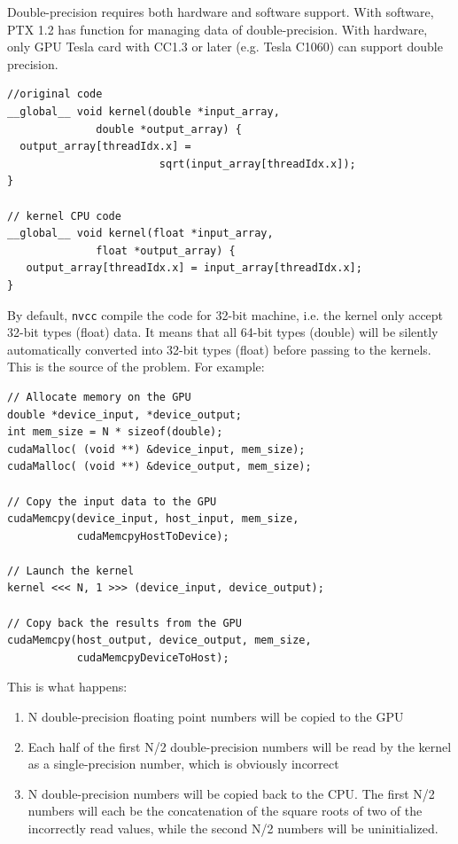 Double-precision requires both hardware and software support. With
software, PTX 1.2 has function for managing data of
double-precision. With hardware, only GPU Tesla card with CC1.3 or
later (e.g. Tesla C1060) can support double precision. 
\begin{lstlisting}
//original code
__global__ void kernel(double *input_array, 
              double *output_array) {
  output_array[threadIdx.x] = 
                        sqrt(input_array[threadIdx.x]);
}

// kernel CPU code
__global__ void kernel(float *input_array, 
              float *output_array) {
   output_array[threadIdx.x] = input_array[threadIdx.x];
}
\end{lstlisting}
By default, \verb!nvcc! compile the code for 32-bit machine, i.e. the
kernel only accept 32-bit types (float) data. It means that all 64-bit
types (double) will be silently automatically converted into 32-bit
types (float) before passing to the kernels. This is the source of the
problem. For example:
\begin{lstlisting}
// Allocate memory on the GPU
double *device_input, *device_output;
int mem_size = N * sizeof(double);
cudaMalloc( (void **) &device_input, mem_size);
cudaMalloc( (void **) &device_output, mem_size);

// Copy the input data to the GPU
cudaMemcpy(device_input, host_input, mem_size, 
           cudaMemcpyHostToDevice);

// Launch the kernel
kernel <<< N, 1 >>> (device_input, device_output);

// Copy back the results from the GPU
cudaMemcpy(host_output, device_output, mem_size, 
           cudaMemcpyDeviceToHost);
\end{lstlisting}

This is what happens:
\begin{enumerate}
\item N double-precision floating point numbers will be copied to the
  GPU
\item Each half of the first N/2 double-precision numbers will be read
  by the kernel as a single-precision number, which is obviously
  incorrect

\item N double-precision numbers will be copied back to the CPU. The
  first N/2 numbers will each be the concatenation of the square roots
  of two of the incorrectly read values, while the second N/2 numbers
  will be uninitialized.
\end{enumerate}

